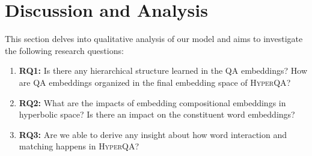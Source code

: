 \documentclass[sigconf]{acmart}
\begin{document}
\section{Discussion and Analysis}
This section delves into qualitative analysis of our model and aims to investigate the following research questions:
\begin{enumerate}
\item \textbf{RQ1:} Is there any hierarchical structure learned in the QA embeddings? How are QA embeddings organized in the final embedding space of \textsc{HyperQA}?
\item \textbf{RQ2:} What are the impacts of embedding compositional embeddings in hyperbolic space? Is there an impact on the constituent word embeddings?
\item \textbf{RQ3:} Are we able to derive any insight about how word interaction and matching happens in \textsc{HyperQA}?
\end{enumerate} 
\end{document}
